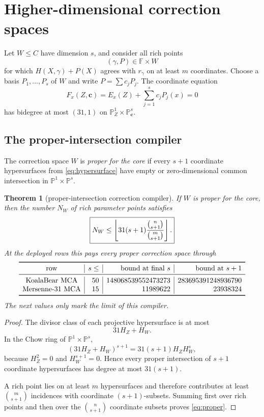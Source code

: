 \documentclass[11pt,a4paper]{amsart}
\numberwithin{equation}{section}
\newtheorem{theorem}{Theorem}[section]
\theoremstyle{remark}
\newcommand{\F}{\mathbb F}\newcommand{\B}{\mathbb B}\newcommand{\K}{\mathbb K}\newcommand{\Z}{\mathbb Z}
\begin{document}
\section{Higher-dimensional correction spaces}

Let $W\le C$ have dimension $s$, and consider all rich points
\[
 (\gamma,P)\in\F\times W
\]
for which $H(X,\gamma)+P(X)$ agrees with $r_\gamma$ on at least $m$ coordinates.  Choose a basis $P_1,\ldots,P_s$ of $W$ and write $P=\sum c_jP_j$.  The coordinate equation
\begin{equation}\label{eq:hypersurface}
 F_x(Z,\mathbf c)=E_x(Z)+\sum_{j=1}^s c_jP_j(x)=0
\end{equation}
has bidegree at most $(31,1)$ on $\mathbb P^1_Z\times\mathbb P^s_{\mathbf c}$.

\subsection{The proper-intersection compiler}

\begin{definition}
The correction space $W$ is \emph{proper for the core} if every $s+1$ coordinate hypersurfaces from \eqref{eq:hypersurface} have empty or zero-dimensional common intersection in $\mathbb P^1\times\mathbb P^s$.
\end{definition}

\begin{theorem}[proper-intersection correction compiler]\label{thm:proper}
If $W$ is proper for the core, then the number $N_W$ of rich parameter points satisfies
\begin{equation}\label{eq:proper}
 \boxed{
 N_W\le
 \left\lfloor 
 31(s+1)\frac{\binom n{s+1}}{\binom m{s+1}}
 \right\rfloor.
 }
\end{equation}
At the deployed rows this pays every proper correction space through
\[
\begin{array}{c|r|r|r}
\toprule
\text{row}&s\le&\text{bound at final }s&\text{bound at }s+1\\
\midrule
\text{KoalaBear MCA}&50&148068539552473273&283695391248936790\\
\text{Mersenne-31 MCA}&15&11989622&23938324\\
\bottomrule
\end{array}
\]
The next values only mark the limit of this compiler.
\end{theorem}

\begin{proof}
The divisor class of each projective hypersurface is at most
\[
 31H_Z+H_W.
\]
In the Chow ring of $\mathbb P^1\times\mathbb P^s$,
\[
 (31H_Z+H_W)^{s+1}=31(s+1)H_ZH_W^s,
\]
because $H_Z^2=0$ and $H_W^{s+1}=0$.  Hence every proper intersection of $s+1$ coordinate hypersurfaces has degree at most $31(s+1)$.

A rich point lies on at least $m$ hypersurfaces and therefore contributes at least $\binom m{s+1}$ incidences with coordinate $(s+1)$-subsets.  Summing first over rich points and then over the $\binom n{s+1}$ coordinate subsets proves \eqref{eq:proper}.
\end{proof}
\end{document}
